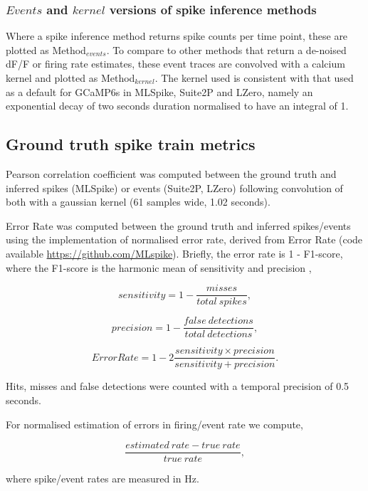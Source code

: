 \documentclass[a4paper,11pt]{article}
\begin{document}
\subsubsection*{$Events$ and $kernel$ versions of spike inference methods}
Where a spike inference method returns spike counts per time point, these are plotted as Method$_{events}$. To compare to other methods that return a de-noised dF/F or firing rate estimates, these event traces are convolved with a calcium kernel and plotted as Method$_{kernel}$. The kernel used is consistent with that used as a default for GCaMP6s in MLSpike, Suite2P and LZero, namely an exponential decay of two seconds duration normalised to have an integral of 1.


\subsection*{Ground truth spike train metrics}
Pearson correlation coefficient was computed between the ground truth and inferred spikes (MLSpike) or events (Suite2P, LZero) following convolution of both with a gaussian kernel (61 samples wide, 1.02 seconds). 

Error Rate was computed between the ground truth and inferred spikes/events using the \cite{Deneux2016-gu} implementation of normalised error rate, derived from \cite{Victor1996-cg} Error Rate (code available \href{https://github.com/MLspike}{https://github.com/MLspike}). Briefly, the error rate is 1 - F1-score, where the F1-score is the harmonic mean of sensitivity and precision \citep{Davis2006-ya},

\[sensitivity = 1 - \frac{misses}{total \ spikes},\]

\[precision = 1 - \frac{false \ detections}{total \ detections},\]

\[Error Rate = 1 - 2 \frac{sensitivity \times precision}{sensitivity + precision}.\]

\noindent Hits, misses and false detections were counted with a temporal precision of 0.5 seconds.

\noindent For normalised estimation of errors in firing/event rate we compute,

\[\frac{estimated \ rate - true \ rate}{true \ rate},\]

\noindent where spike/event rates are measured in Hz.
\end{document}
